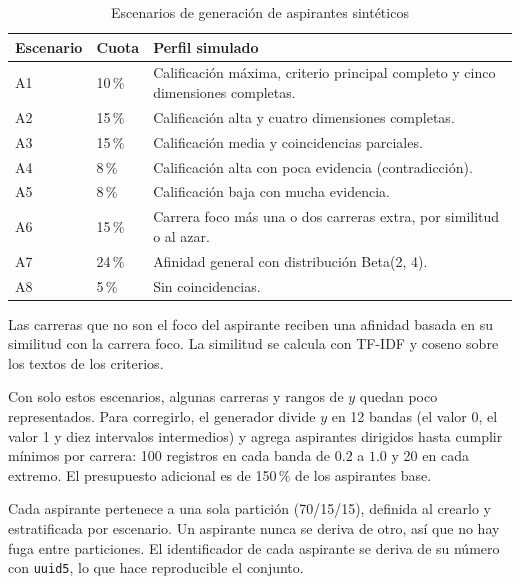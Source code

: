 \begin{table}[H]
\centering
\small
\renewcommand{\arraystretch}{1.2}
\caption{Escenarios de generación de aspirantes sintéticos}
\label{tab:escenarios}
\begin{tabularx}{\textwidth}{L{0.14\textwidth}L{0.10\textwidth}X}
\toprule
{} \color{white}\textbf{Escenario} & \color{white}\textbf{Cuota} & \color{white}\textbf{Perfil simulado} \\
\midrule
A1 & 10\,\% & Calificación máxima, criterio principal completo y cinco dimensiones completas. \\
A2 & 15\,\% & Calificación alta y cuatro dimensiones completas. \\
A3 & 15\,\% & Calificación media y coincidencias parciales. \\
A4 & 8\,\% & Calificación alta con poca evidencia (contradicción). \\
A5 & 8\,\% & Calificación baja con mucha evidencia. \\
A6 & 15\,\% & Carrera foco más una o dos carreras extra, por similitud o al azar. \\
A7 & 24\,\% & Afinidad general con distribución Beta(2, 4). \\
A8 & 5\,\% & Sin coincidencias. \\
\bottomrule
\end{tabularx}
\end{table}

Las carreras que no son el foco del aspirante reciben una afinidad basada en su similitud con la carrera foco. La similitud se calcula con TF-IDF y coseno sobre los textos de los criterios.

Con solo estos escenarios, algunas carreras y rangos de $y$ quedan poco representados. Para corregirlo, el generador divide $y$ en 12 bandas (el valor 0, el valor 1 y diez intervalos intermedios) y agrega aspirantes dirigidos hasta cumplir mínimos por carrera: 100 registros en cada banda de $0.2$ a $1.0$ y 20 en cada extremo. El presupuesto adicional es de 150\,\% de los aspirantes base.

Cada aspirante pertenece a una sola partición (70/15/15), definida al crearlo y estratificada por escenario. Un aspirante nunca se deriva de otro, así que no hay fuga entre particiones. El identificador de cada aspirante se deriva de su número con \texttt{uuid5}, lo que hace reproducible el conjunto.

